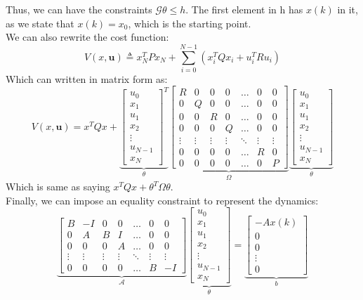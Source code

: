 \documentclass{article}
\begin{document}
Thus, we can have the constraints $\mathcal{G} \theta \leq h$. The first element in h has $x(k)$ in it, as we state that $x(k) = x_0$, which is the starting point. \\
We can also rewrite the cost function:
\[
V(x, \textbf{u}) \triangleq x_N^TPx_N + \sum_{i=0}^{N-1}\left(x_i^TQx_i + u_i^TRu_i \right)
\]
Which can written in matrix form as:
\[
V(x, \textbf{u}) = x^TQx + 
\underbrace{\begin{bmatrix}
    u_0 \\ x_1 \\ u_1 \\ x_2 \\ \vdots \\ u_{N-1} \\ x_N
\end{bmatrix}^T}_{\theta}
\underbrace{\begin{bmatrix}
    R & 0 & 0 & 0 & \hdots & 0 & 0 \\
    0 & Q & 0 & 0 & \hdots & 0 & 0 \\
    0 & 0& R & 0 & \hdots & 0 & 0 \\
    0 & 0 & 0 & Q & \hdots & 0 & 0 \\
    \vdots & \vdots & \vdots & \vdots & \ddots & \vdots & \vdots \\
    0 & 0 & 0 & 0 & \hdots & R & 0 \\
    0 & 0 & 0 & 0 & \hdots & 0 & P 
\end{bmatrix}}_{\Omega}
\underbrace{\begin{bmatrix}
    u_0 \\ x_1 \\ u_1 \\ x_2 \\ \vdots \\ u_{N-1} \\ x_N
\end{bmatrix}}_{\theta}
\]
Which is same as saying $x^TQx + \theta^T\Omega \theta$. \\
Finally, we can impose an equality constraint to represent the dynamics:
\[
\underbrace{\begin{bmatrix}
    B & -I & 0 & 0 & \hdots & 0 & 0 \\
    0 & A & B & I & \hdots & 0 & 0 \\
0& 0& 0 & A & \hdots & 0 & 0 \\
\vdots & \vdots & \vdots & \vdots & \ddots & \vdots & \vdots  \\
0& 0& 0 & 0 & \hdots & B & -I
\end{bmatrix}}_{\mathcal{A}}
\underbrace{\begin{bmatrix}
    u_0 \\ x_1 \\ u_1 \\ x_2 \\ \vdots \\ u_{N-1} \\ x_N
\end{bmatrix}}_{\theta} =
\underbrace{\begin{bmatrix}
    -Ax(k) \\ 0 \\ 0 \\ \vdots \\ 0
\end{bmatrix}}_{b}
\]
\end{document}
